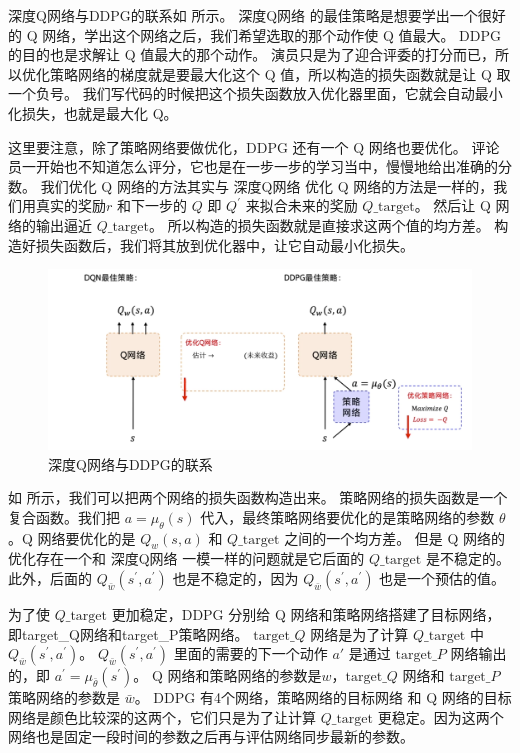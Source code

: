 深度Q网络与DDPG的联系如 所示。
深度Q网络 的最佳策略是想要学出一个很好的 Q 网络，学出这个网络之后，我们希望选取的那个动作使 Q 值最大。
DDPG 的目的也是求解让 Q 值最大的那个动作。
演员只是为了迎合评委的打分而已，所以优化策略网络的梯度就是要最大化这个 Q 值，所以构造的损失函数就是让 Q 取一个负号。
我们写代码的时候把这个损失函数放入优化器里面，它就会自动最小化损失，也就是最大化 Q。

这里要注意，除了策略网络要做优化，DDPG 还有一个 Q 网络也要优化。
评论员一开始也不知道怎么评分，它也是在一步一步的学习当中，慢慢地给出准确的分数。
我们优化 Q 网络的方法其实与 深度Q网络 优化 Q 网络的方法是一样的，我们用真实的奖励$r$ 和下一步的 $Q$ 即 $Q^{\prime}$ 来拟合未来的奖励 $Q\_\text{target}$。
然后让 Q 网络的输出逼近 $Q\_\text{target}$。
所以构造的损失函数就是直接求这两个值的均方差。
构造好损失函数后，我们将其放到优化器中，让它自动最小化损失。


\begin{figure}[hbt]
  \centering
  \includegraphics[width=0.7\linewidth]{res/ch12/12.7}
  \caption{深度Q网络与DDPG的联系}
  \label{fig:fig12.7}
\end{figure}

如 所示，我们可以把两个网络的损失函数构造出来。
策略网络的损失函数是一个复合函数。我们把 $a = \mu_\theta(s)$ 代入，最终策略网络要优化的是策略网络的参数 $\theta$ 。Q 网络要优化的是 $Q_w(s,a)$ 和 $Q\_\text{target}$ 之间的一个均方差。
但是 Q 网络的优化存在一个和 深度Q网络 一模一样的问题就是它后面的 $Q\_\text{target}$ 是不稳定的。此外，后面的 $Q_{\bar{w}}\left(s^{\prime}, a^{\prime}\right)$ 也是不稳定的，因为 $Q_{\bar{w}}\left(s^{\prime}, a^{\prime}\right)$ 也是一个预估的值。

为了使 $Q\_\text{target}$ 更加稳定，DDPG 分别给 Q 网络和策略网络搭建了目标网络，即target\_Q网络和target\_P策略网络。
$\text{target}\_Q$ 网络是为了计算 $Q\_\text{target}$ 中 $Q_{\bar{w}}\left(s^{\prime}, a^{\prime}\right)$。
$Q_{\bar{w}}\left(s^{\prime}, a^{\prime}\right)$ 里面的需要的下一个动作 $a'$  是通过 $\text{target}\_P$ 网络输出的，即 $a^{\prime}=\mu_{\bar{\theta}}\left(s^{\prime}\right)$。
Q 网络和策略网络的参数是$w$，$\text{target}\_Q$ 网络和 $\text{target}\_P$ 策略网络的参数是 $\bar{w}$。
DDPG 有4个网络，策略网络的目标网络 和 Q 网络的目标网络是颜色比较深的这两个，它们只是为了让计算 $Q\_\text{target}$ 更稳定。因为这两个网络也是固定一段时间的参数之后再与评估网络同步最新的参数。

